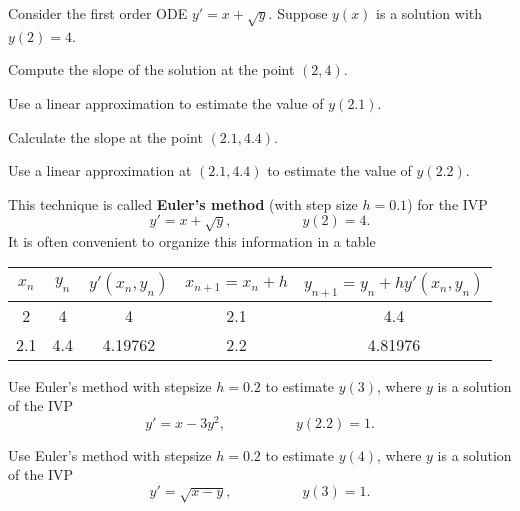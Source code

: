 \begin{applicationActivities}

\begin{activity}{10}
Consider the first order ODE \(y'= x+\sqrt{y}\).  Suppose \(y(x)\) is a solution with \(y(2)=4\).
\begin{subactivity}
Compute the slope of the solution at the point \((2,4)\).
\end{subactivity}
\begin{subactivity}
Use a linear approximation to estimate the value of \(y(2.1)\).
\end{subactivity}
\begin{subactivity}
Calculate the slope at the point \((2.1,4.4)\).
\end{subactivity}
\begin{subactivity}
Use a linear approximation at \((2.1,4.4)\) to estimate the value of \(y(2.2)\).
\end{subactivity}
\end{activity}

\begin{observation}
This technique is called \textbf{Euler's method} (with step size \(h=0.1\)) for the IVP
\[y'=x+\sqrt{y},\hspace{5em} y(2)=4.\]
\vfill
It is often convenient to organize this information in a table
\begin{center}
\begin{tabular}{c|c|c|c|c}
\(x_n\) & \(y_n\) & \(y'(x_n,y_n)\) & \(x_{n+1}=x_n+h\) & \(y_{n+1}=y_n+hy'(x_n,y_n)\) \\ \hline \hline
2 & 4 & 4 & 2.1 & 4.4 \\ \hline
2.1 & 4.4 & 4.19762 & 2.2 & 4.81976 \\\hline
\end{tabular}
\end{center}
\end{observation}

\begin{activity}{10}
Use Euler's method with stepsize \(h=0.2\) to estimate \(y(3)\), where \(y\) is a solution of the IVP
\[ y'= x-3y^2, \hspace{5em} y(2.2)=1.\]
\end{activity}

\begin{activity}{10}
Use Euler's method with stepsize \(h=0.2\) to estimate \(y(4)\), where \(y\) is a solution of the IVP
\[ y'= \sqrt{x-y}, \hspace{5em} y(3)=1.\]
\end{activity}

\end{applicationActivities}
